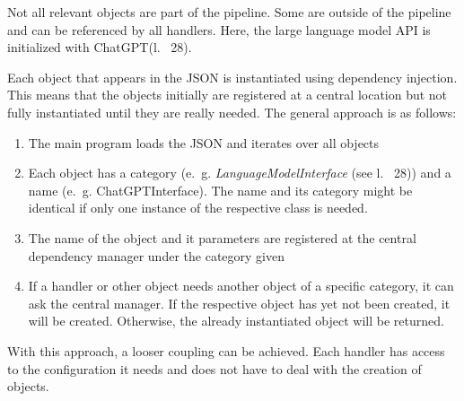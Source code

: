 Not all relevant objects are part of the pipeline. Some are outside of the pipeline and can be referenced by all handlers. Here, the large language model \ac{API} is initialized with ChatGPT(l.~ 28).

Each object that appears in the \ac{JSON} is instantiated using dependency injection. This means that the objects initially are registered at a central location but not fully instantiated until they are really needed. The general approach is as follows:
\begin{enumerate}
    \item The main program loads the \ac{JSON} and iterates over all objects
    \item Each object has a category (e.~g. \textit{LanguageModelInterface} (see l.~ 28)) and a name (e.~g. ChatGPTInterface). The name and its category might be identical if only one instance of the respective class is needed. 
    \item The name of the object and it parameters are registered at the central dependency manager under the category given
    \item If a handler or other object needs another object of a specific category, it can ask the central manager. If the respective object has  yet not been created, it will be created. Otherwise, the already instantiated object will be returned. 
\end{enumerate}
With this approach, a looser coupling can be achieved. Each handler has access to the configuration it needs and does not have to deal with the creation of objects. 